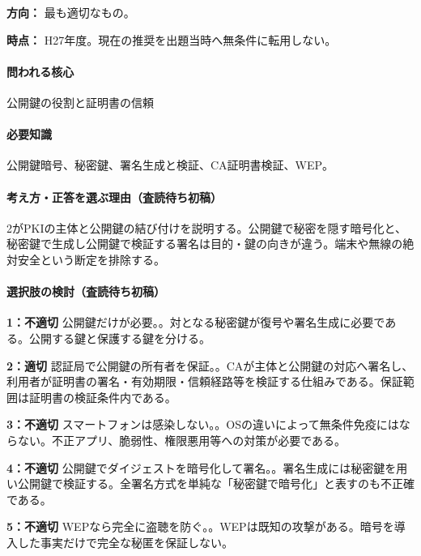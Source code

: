 \noindent\textbf{方向：} 最も適切なもの。\par

\noindent\textbf{時点：} H27年度。現在の推奨を出題当時へ無条件に転用しない。\par

\paragraph{問われる核心} 公開鍵の役割と証明書の信頼

\paragraph{必要知識} 公開鍵暗号、秘密鍵、署名生成と検証、CA証明書検証、WEP。

\paragraph{考え方・正答を選ぶ理由（査読待ち初稿）} 2がPKIの主体と公開鍵の結び付けを説明する。公開鍵で秘密を隠す暗号化と、秘密鍵で生成し公開鍵で検証する署名は目的・鍵の向きが違う。端末や無線の絶対安全という断定を排除する。

\paragraph{選択肢の検討（査読待ち初稿）}\mbox{}\par

\noindent\textbf{1：不適切} 公開鍵だけが必要。。対となる秘密鍵が復号や署名生成に必要である。公開する鍵と保護する鍵を分ける。\par

\noindent\textbf{2：適切} 認証局で公開鍵の所有者を保証。。CAが主体と公開鍵の対応へ署名し、利用者が証明書の署名・有効期限・信頼経路等を検証する仕組みである。保証範囲は証明書の検証条件内である。\par

\noindent\textbf{3：不適切} スマートフォンは感染しない。。OSの違いによって無条件免疫にはならない。不正アプリ、脆弱性、権限悪用等への対策が必要である。\par

\noindent\textbf{4：不適切} 公開鍵でダイジェストを暗号化して署名。。署名生成には秘密鍵を用い公開鍵で検証する。全署名方式を単純な「秘密鍵で暗号化」と表すのも不正確である。\par

\noindent\textbf{5：不適切} WEPなら完全に盗聴を防ぐ。。WEPは既知の攻撃がある。暗号を導入した事実だけで完全な秘匿を保証しない。\par

